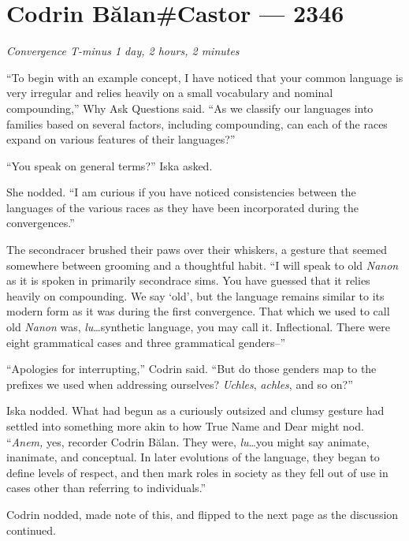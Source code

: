 \hypertarget{codrin-bux103lancastor-2346}{%
\chapter{Codrin Bălan\#Castor — 2346}}

\begin{center}
\emph{Convergence T-minus 1 day, 2 hours, 2 minutes}
\end{center}

\noindent ``To begin with an example concept, I have noticed that your common language is very irregular and relies heavily on a small vocabulary and nominal compounding,'' Why Ask Questions said. ``As we classify our languages into families based on several factors, including compounding, can each of the races expand on various features of their languages?''

``You speak on general terms?'' Iska asked.

She nodded. ``I am curious if you have noticed consistencies between the languages of the various races as they have been incorporated during the convergences.''

The secondracer brushed their paws over their whiskers, a gesture that seemed somewhere between grooming and a thoughtful habit. ``I will speak to old \emph{Nanon} as it is spoken in primarily secondrace sims. You have guessed that it relies heavily on compounding. We say `old', but the language remains similar to its modern form as it was during the first convergence. That which we used to call old \emph{Nanon} was, \emph{lu}\ldots synthetic language, you may call it. Inflectional. There were eight grammatical cases and three grammatical genders--''

``Apologies for interrupting,'' Codrin said. ``But do those genders map to the prefixes we used when addressing ourselves? \emph{Uchles}, \emph{achles}, and so on?''

Iska nodded. What had begun as a curiously outsized and clumsy gesture had settled into something more akin to how True Name and Dear might nod. ``\emph{Anem,} yes, recorder Codrin Bălan. They were, \emph{lu}\ldots you might say animate, inanimate, and conceptual. In later evolutions of the language, they began to define levels of respect, and then mark roles in society as they fell out of use in cases other than referring to individuals.''

Codrin nodded, made note of this, and flipped to the next page as the discussion continued.

